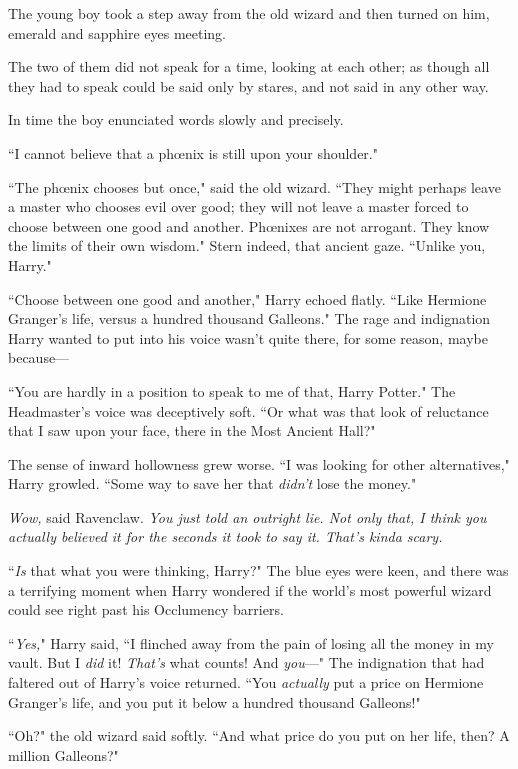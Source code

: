The young boy took a step away from the old wizard and then turned on him, emerald and sapphire eyes meeting.

The two of them did not speak for a time, looking at each other; as though all they had to speak could be said only by stares, and not said in any other way.

In time the boy enunciated words slowly and precisely.

``I cannot believe that a phœnix is still upon your shoulder."

``The phœnix chooses but once," said the old wizard. ``They might perhaps leave a master who chooses evil over good; they will not leave a master forced to choose between one good and another. Phœnixes are not arrogant. They know the limits of their own wisdom." Stern indeed, that ancient gaze. ``Unlike you, Harry."

``Choose between one good and another," Harry echoed flatly. ``Like Hermione Granger's life, versus a hundred thousand Galleons." The rage and indignation Harry wanted to put into his voice wasn't quite there, for some reason, maybe because—

``You are hardly in a position to speak to me of that, Harry Potter." The Headmaster's voice was deceptively soft. ``Or what was that look of reluctance that I saw upon your face, there in the Most Ancient Hall?"

The sense of inward hollowness grew worse. ``I was looking for other alternatives," Harry growled. ``Some way to save her that \emph{didn't} lose the money."

\emph{Wow,} said Ravenclaw. \emph{You just told an outright lie. Not only that, I think you actually \emph{believed} it for the seconds it took to say it. That's kinda scary.}

``\emph{Is} that what you were thinking, Harry?" The blue eyes were keen, and there was a terrifying moment when Harry wondered if the world's most powerful wizard could see right past his Occlumency barriers.

``\emph{Yes,}" Harry said, ``I flinched away from the pain of losing all the money in my vault. But I \emph{did} it! \emph{That's} what counts! And \emph{you}—" The indignation that had faltered out of Harry's voice returned. ``You \emph{actually} put a price on Hermione Granger's life, and you put it below a hundred thousand Galleons!"

``Oh?" the old wizard said softly. ``And what price do you put on her life, then? A million Galleons?"

